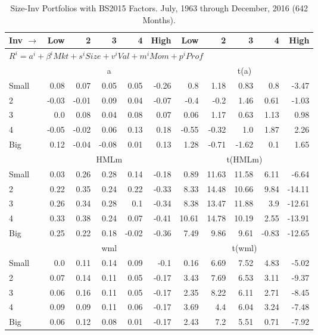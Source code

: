 
\begin{table}[!ht]
\centering
\caption{Size-Inv Portfolios with BS2015 Factors. \footnotesize{July, 1963 through December, 2016 (642 Months).}}
\begin{tabular}{lrrrrrrrrrr}
  \toprule
  Inv $\rightarrow$ & Low & 2 & 3 & 4 & High & Low & 2 & 3 & 4 & High \\ 
  \toprule
  \multicolumn{9}{l}{$R^i=a^i+\beta^iMkt+s^iSize+v^iVal+m^iMom+p^iProf$} \\

  

      & \multicolumn{5}{c}{a} & \multicolumn{5}{c}{t(a)} \\
    \cmidrule(r){2-6} \cmidrule(r){7-11}
      Small  & 0.08  & 0.07  & 0.05  & 0.05  & -0.26   & 0.8  & 1.18  & 0.83  & 0.8  & -3.47  \\
          2  & -0.03  & -0.01  & 0.09  & 0.04  & -0.07   & -0.4  & -0.2  & 1.46  & 0.61  & -1.03  \\
          3  & 0.0  & 0.08  & 0.04  & 0.08  & 0.07   & 0.06  & 1.17  & 0.63  & 1.13  & 0.98  \\
          4  & -0.05  & -0.02  & 0.06  & 0.13  & 0.18   & -0.55  & -0.32  & 1.0  & 1.87  & 2.26  \\
      Big    & 0.12  & -0.04  & -0.08  & 0.01  & 0.13   & 1.28  & -0.71  & -1.62  & 0.1  & 1.65  \\

  
      & \multicolumn{5}{c}{HMLm} & \multicolumn{5}{c}{t(HMLm)} \\
    \cmidrule(r){2-6} \cmidrule(r){7-11}
      Small  & 0.03  & 0.26  & 0.28  & 0.14  & -0.18   & 0.89  & 11.63  & 11.58  & 6.11  & -6.64  \\
          2  & 0.22  & 0.35  & 0.24  & 0.22  & -0.33   & 8.33  & 14.48  & 10.66  & 9.84  & -14.11  \\
          3  & 0.26  & 0.34  & 0.28  & 0.1  & -0.34   & 8.38  & 13.47  & 11.88  & 3.9  & -12.61  \\
          4  & 0.33  & 0.38  & 0.24  & 0.07  & -0.41   & 10.61  & 14.78  & 10.19  & 2.55  & -13.91  \\
      Big    & 0.25  & 0.22  & 0.18  & -0.02  & -0.36   & 7.49  & 9.86  & 9.61  & -0.83  & -12.65  \\

      & \multicolumn{5}{c}{wml} & \multicolumn{5}{c}{t(wml)} \\
    \cmidrule(r){2-6} \cmidrule(r){7-11}
      Small  & 0.0  & 0.11  & 0.14  & 0.09  & -0.1   & 0.16  & 6.69  & 7.52  & 4.83  & -5.02  \\
          2  & 0.07  & 0.14  & 0.11  & 0.05  & -0.17   & 3.43  & 7.69  & 6.53  & 3.11  & -9.37  \\
          3  & 0.06  & 0.16  & 0.11  & 0.05  & -0.17   & 2.35  & 8.22  & 6.11  & 2.71  & -8.45  \\
          4  & 0.09  & 0.09  & 0.11  & 0.06  & -0.17   & 3.69  & 4.4  & 6.04  & 3.24  & -7.48  \\
      Big    & 0.06  & 0.12  & 0.08  & 0.01  & -0.17   & 2.43  & 7.2  & 5.51  & 0.71  & -7.92  \\

  

  \bottomrule
\end{tabular}
\label{tbl:25_Size_Inv_BS2015}
\end{table}